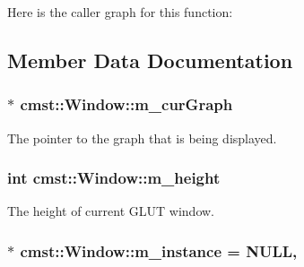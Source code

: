 Here is the caller graph for this function\+:




\subsection{Member Data Documentation}
\subsubsection[{\texorpdfstring{m\+\_\+cur\+Graph}{m_curGraph}}]{$\ast$ cmst\+::\+Window\+::m\+\_\+cur\+Graph\hspace{0.3cm}{\ttfamily [private]}}\hypertarget{classcmst_1_1_window_a86d6a605ac3dc593de030802009e73bc}{}\label{classcmst_1_1_window_a86d6a605ac3dc593de030802009e73bc}


The pointer to the graph that is being displayed. 

\subsubsection[{\texorpdfstring{m\+\_\+height}{m_height}}]{\setlength{\rightskip}{0pt plus 5cm}int cmst\+::\+Window\+::m\+\_\+height\hspace{0.3cm}{\ttfamily [private]}}\hypertarget{classcmst_1_1_window_a9447754382ddb8894d50a40d19f027a3}{}\label{classcmst_1_1_window_a9447754382ddb8894d50a40d19f027a3}


The height of current G\+L\+UT window. 

\subsubsection[{\texorpdfstring{m\+\_\+instance}{m_instance}}]{ $\ast$ cmst\+::\+Window\+::m\+\_\+instance = N\+U\+LL\hspace{0.3cm}{\ttfamily [static]}, {\ttfamily [private]}}\hypertarget{classcmst_1_1_window_a04ea9e382288b5d903542ee3f53b3617}{}\label{classcmst_1_1_window_a04ea9e382288b5d903542ee3f53b3617}



